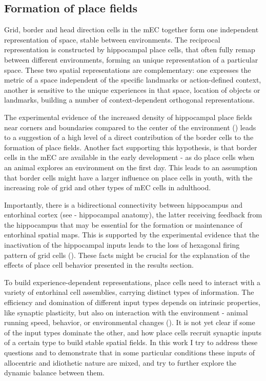 \subsection{Formation of place fields}

Grid, border and head direction cells in the mEC together form one independent representation of space, stable between environments. The reciprocal representation is constructed by hippocampal place cells, that often fully remap between different environments, forming an unique representation of a particular space. These two spatial representations are complementary: one expresses the metric of a space independent of the specific landmarks or action-defined context, another is sensitive to the unique experiences in that space, location of objects or landmarks, building a number of context-dependent orthogonal representations.

The experimental evidence of the increased density of hippocampal place fields near corners and boundaries compared to the center of the environment (\cite{Wiener2737}) leads to a suggestion of a high level of a direct contribution of the border cells to the formation of place fields. Another fact supporting this hypothesis, is that border cells in the mEC are available in the early development - as do place cells when an animal explores an environment on the first day. This leads to an assumption that border cells might have a larger influence on place cells in youth, with the increasing role of grid and other types of mEC cells in adulthood.

Importantly, there is a bidirectional connectivity between hippocampus and entorhinal cortex (see - hippocampal anatomy), the latter receiving feedback from the hippocampus that may be essential for the formation or maintenance of entorhinal spatial maps. This is supported by the experimental evidence that the inactivation of the hippocampal inputs leads to the loss of hexagonal firing pattern of grid cells (\cite{Bonnevie2013}). These facts might be crucial for the explanation of the effects of place cell behavior presented in the results section.

To build experience-dependent representations, place cells need to interact with a variety of entorhinal cell assemblies, carrying distinct types of information. The efficiency and domination of different input types depends on intrinsic properties, like synaptic plasticity, but also on interaction with the environment - animal running speed, behavior, or environmental changes (\cite{Igarashi2014}). It is not yet clear if some of the input types dominate the other, and how place cells recruit synaptic inputs of a certain type to build stable spatial fields. In this work I try to address these questions and to demonstrate that in some particular conditions these inputs of allocentric and idiothetic nature are mixed, and try to further explore the dynamic balance between them.


